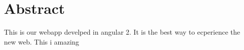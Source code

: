 \chapter{Abstract}
\label{chap:abstract}

This is our webapp develped in angular 2\cite{Angular2:online}. It is the best way to ecperience the new web. This i amazing